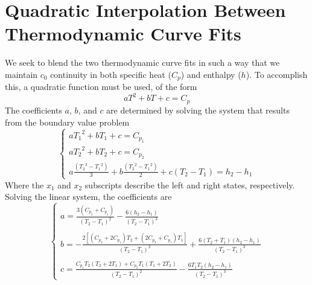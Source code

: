 \chapter{Quadratic Interpolation Between Thermodynamic Curve Fits}
\label{sec:quad-cp-blending}

We seek to blend the two thermodynamic curve fits in such a way that we maintain
$c_0$ continuity in both specific heat ($C_p$) and enthalpy ($h$).  To
accomplish this, a quadratic function must be used, of the form
\begin{equation}
  a T^2 + b T + c = C_p
  \label{generic_form}
\end{equation}
The coefficients $a$, $b$, and $c$ are determined by solving the system that
results from the boundary value problem
\begin{equation}
  \begin{cases}
    a {T_1}^{2} + b T_1 +c = C_{p_1} \\
    a {T_2}^{2} + b T_2 +c = C_{p_2} \\
    a \frac{\left( {T_2}^{3} - {T_1}^{3}\right) }{3} + b\frac{ \left( {T_2}^{2} - {T_1}^{2}\right) }{2} + c \left( T_2 - T_1\right) = h_2-h_1
  \end{cases}
\end{equation}
Where the $x_1$ and $x_2$ subscripts describe the left and right states,
respectively.  Solving the linear system, the coefficients are
\begin{equation}
  \begin{cases}
    a=\frac{3\left( C_{p_2}+ C_{p_1}\right) }{(T_2-T_1)^{2}} - \frac{6 \left(h_2 - h_1\right)}{(T_2-T_1)^{3}}\\ \\
    b=-\frac{2\left[(C_{p_2} + 2C_{p_1})T_2 + (2C_{p_2} + C_{p_1})T_1\right]}{(T_2-T_1)^{2}} + \frac{6(T_2+T_1)(h_2 - h_1)}{(T_2 - T_1)^3}\\ \\
    c=\frac{C_{p_1} T_2 (T_2 + 2T_1) + C_{p_2} T_1 (T_1 + 2 T_2)}{(T_2-T_1)^2} - \frac{6 T_1 T_2 (h_2 - h_1)}{(T_2 - T_1)^3}
  \end{cases}
\end{equation}
